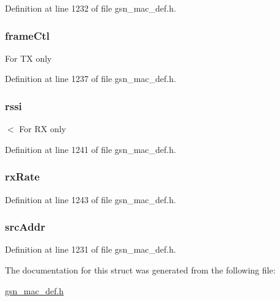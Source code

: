 Definition at line 1232 of file gsn\_\-mac\_\-def.h.

\hypertarget{a00124_a07e8719e40ad3ff98ea9b09cdf95af2a}{
\subsubsection[{frameCtl}]{ {\bf frameCtl}}}
\label{a00124_a07e8719e40ad3ff98ea9b09cdf95af2a}
For TX only 

Definition at line 1237 of file gsn\_\-mac\_\-def.h.

\hypertarget{a00124_ac219f836c66b6004ed87869ec52604f5}{
\subsubsection[{rssi}]{ {\bf rssi}}}
\label{a00124_ac219f836c66b6004ed87869ec52604f5}
$<$ For RX only 

Definition at line 1241 of file gsn\_\-mac\_\-def.h.

\hypertarget{a00124_ac407ca9f2ce8b1dc4ee5c302e5b18c2b}{
\subsubsection[{rxRate}]{ {\bf rxRate}}}
\label{a00124_ac407ca9f2ce8b1dc4ee5c302e5b18c2b}


Definition at line 1243 of file gsn\_\-mac\_\-def.h.

\hypertarget{a00124_a256233a2b5125c28f7ee741edd0f37d0}{
\subsubsection[{srcAddr}]{ {\bf srcAddr}}}
\label{a00124_a256233a2b5125c28f7ee741edd0f37d0}


Definition at line 1231 of file gsn\_\-mac\_\-def.h.



The documentation for this struct was generated from the following file:\begin{DoxyCompactItemize}
\item 
\hyperlink{a00522}{gsn\_\-mac\_\-def.h}\end{DoxyCompactItemize}
